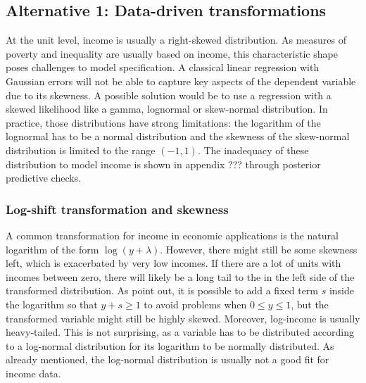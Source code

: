 \subsection{Alternative 1: Data-driven transformations}

At the unit level, income is usually a right-skewed distribution.
As measures of poverty and inequality are usually based on income, this characteristic shape poses challenges to model specification.
A classical linear regression with Gaussian errors will not be able to capture key aspects of the dependent variable due to its skewness.
A possible solution would be to use a regression with a skewed likelihood like a gamma, lognormal or skew-normal distribution.
In practice, those distributions have strong limitations: the logarithm of the lognormal has to be a normal distribution and the skewness of the skew-normal distribution is limited to the range $(-1, 1)$.
The inadequacy of these distribution to model income is shown in appendix ??? through posterior predictive checks.

\subsubsection{Log-shift transformation and skewness}
A common transformation for income in economic applications is the natural logarithm of the form $\log(y + \lambda)$. However, there might still be some skewness left, which is exacerbated by very low incomes.
If there are a lot of units with incomes between zero, there will likely be a long tail to the in the left side of the transformed distribution.
As \cite{rojas_perilla_data_2020} point out, it is possible to add a fixed term $s$ inside the logarithm so that $y+s \ge 1$ to avoid problems when $0 \le y \le 1$,
but the transformed variable might still be highly skewed.
Moreover, log-income is usually heavy-tailed.
This is not surprising, as a variable has to be distributed according to a log-normal distribution for its logarithm to be normally distributed.
As already mentioned, the log-normal distribution is usually not a good fit for income data.

